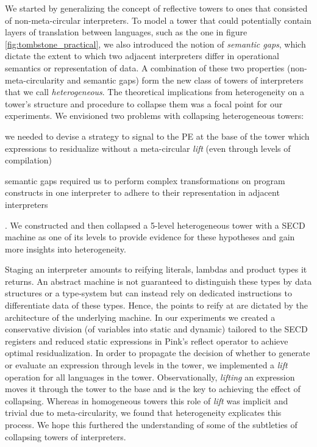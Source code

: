 \documentclass[sigplan,anonymous,review]{acmart}
\theoremstyle{definition}
\begin{document}
We started by generalizing the concept of reflective towers to ones that consisted of non-meta-circular interpreters. To model a tower that could potentially contain layers of translation between languages, such as the one in figure \ref{fig:tombstone_practical}, we also introduced the notion of \textit{semantic gaps}, which dictate the extent to which two adjacent interpreters differ in operational semantics or representation of data. A combination of these two properties (non-meta-circularity and semantic gaps) form the new class of towers of interpreters that we call \textit{heterogeneous}. The theoretical implications from heterogeneity on a tower's structure and procedure to collapse them was a focal point for our experiments. We envisioned two problems with collapsing heterogeneous towers:
\begin{enumerate*}[label=(\arabic*)]
    \item we needed to devise a strategy to signal to the PE at the base of the tower which expressions to residualize without a meta-circular \textit{lift} (even through levels of compilation)
    \item semantic gaps required us to perform complex transformations on program constructs in one interpreter to adhere to their representation in adjacent interpreters
\end{enumerate*}. We constructed and then collapsed a 5-level heterogeneous tower with a SECD machine as one of its levels to provide evidence for these hypotheses and gain more insights into heterogeneity.

Staging an interpreter amounts to reifying literals, lambdas and product types it returns. An abstract machine is not guaranteed to distinguish these types by data structures or a type-system but can instead rely on dedicated instructions to differentiate data of these types. Hence, the points to reify at are dictated by the architecture of the underlying machine. In our experiments we created a conservative division (of variables into static and dynamic)
tailored to the SECD registers
and reduced static expressions in Pink's reflect operator to achieve optimal residualization. In order to propagate the decision of whether to generate or evaluate an expression through levels in the tower, we implemented a \textit{lift} operation for all languages in the tower. Observationally, \textit{lifting} an expression moves it through the tower to the base and is the key to achieving the effect of collapsing. Whereas in homogeneous towers this role of \textit{lift} was implicit and trivial due to meta-circularity, we found that heterogeneity explicates this process. We hope this furthered the understanding of some of the subtleties of collapsing towers of interpreters.
\end{document}
